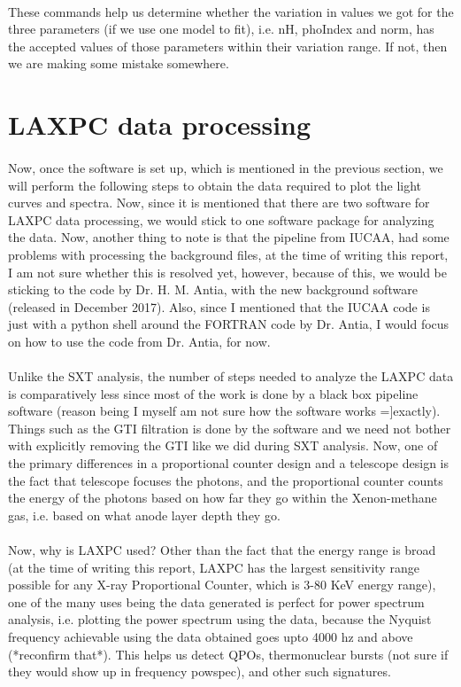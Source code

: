 \documentclass[a4paper,twoside]{report}
\numberwithin{equation}{section}
\begin{document}
\paragraph{}
These commands help us determine whether the variation in values we got for the three parameters (if we use one model to fit), i.e. nH, phoIndex and norm, has the accepted values of those parameters within their variation range. If not, then we are making some mistake somewhere.
\newpage
\section{LAXPC data processing}
\paragraph{}
Now, once the software is set up, which is mentioned in the previous section, we will perform the following steps to obtain the data required to plot the light curves and spectra. Now, since it is mentioned that there are two software for LAXPC data processing, we would stick to one software package for analyzing the data. Now, another thing to note is that the pipeline from IUCAA, had some problems with processing the background files, at the time of writing this report, I am not sure whether this is resolved yet, however, because of this, we would be sticking to the code by Dr. H. M. Antia, with the new background software (released in December 2017). Also, since I mentioned that the IUCAA code is just with a python shell around the FORTRAN code by Dr. Antia, I would  focus on how to use the code from Dr. Antia, for now. 
\paragraph{}
Unlike the SXT analysis, the number of steps needed to analyze the LAXPC data is comparatively less since most of the work is done by a black box pipeline software (reason being I myself am not sure how the software works =]exactly). Things such as the GTI filtration is done by the software and we need not bother with explicitly removing the GTI like we did during SXT analysis. Now, one of the primary differences in a proportional counter design and a telescope design is the fact that telescope focuses the photons, and the proportional counter counts the energy of the photons based on how far they go within the Xenon-methane gas, i.e. based on what anode layer depth they go. 
\paragraph{}
Now, why is LAXPC used? Other than the fact that the energy range is broad (at the time of writing this report, LAXPC has the largest sensitivity range possible for any X-ray Proportional Counter, which is 3-80 KeV energy range), one of the many uses being the data generated is perfect for power spectrum analysis, i.e. plotting the power spectrum using the data, because the Nyquist frequency achievable using the data obtained goes upto 4000 hz and above (*reconfirm that*). This helps us detect QPOs, thermonuclear bursts (not sure if they would show up in frequency powspec), and other such signatures. 
\end{document}
